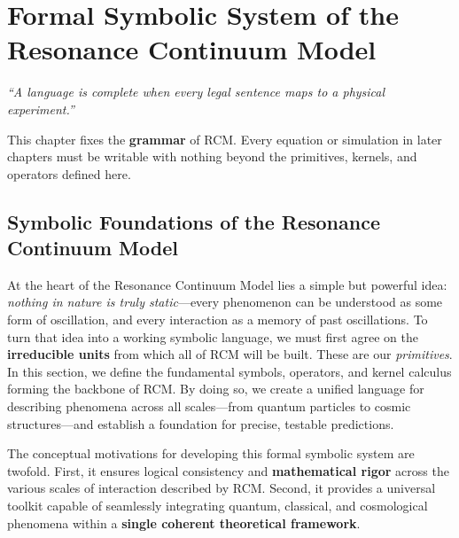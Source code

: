 \chapter{Formal Symbolic System of the Resonance Continuum Model}
\makeatletter
{}
\makeatother

\makeatletter
{}
\theoremstyle{definition}
\makeatother




\begin{center}
\emph{“A language is complete when every legal sentence maps to a physical experiment.”}
\end{center}

\begin{concept}
This chapter fixes the \textbf{grammar} of RCM.  
Every equation or simulation in later chapters must be writable with
nothing beyond the primitives, kernels, and operators defined here.
\end{concept}


\section{Symbolic Foundations of the Resonance Continuum Model}
At the heart of the Resonance Continuum Model lies a simple but powerful idea: \emph{nothing in nature is truly static}—every phenomenon can be understood as some form of oscillation, and every interaction as a memory of past oscillations. To turn that idea into a working symbolic language, we must first agree on the \textbf{irreducible units} from which all of RCM will be built. These are our \emph{primitives}. In this section, we define the fundamental symbols, operators, and kernel calculus forming the backbone of RCM. By doing so, we create a unified language for describing phenomena across all scales—from quantum particles to cosmic structures—and establish a foundation for precise, testable predictions.

\begin{concept}
The conceptual motivations for developing this formal symbolic system are twofold. First, it ensures logical consistency and \textbf{mathematical rigor} across the various scales of interaction described by RCM. Second, it provides a universal toolkit capable of seamlessly integrating quantum, classical, and cosmological phenomena within a \textbf{single coherent theoretical framework}.
\end{concept}

